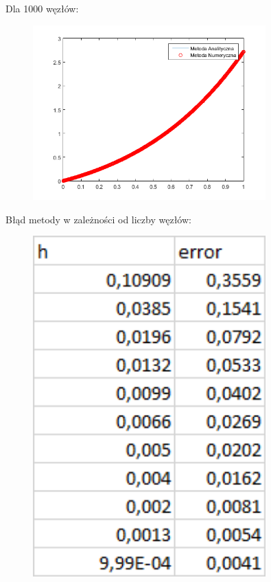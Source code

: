 \begin{samepage}
	Dla 1000 węzłów:
	
	\FloatBarrier
	\begin{figure}[!ht]
		\begin{center}
			\includegraphics[width=0.8\textwidth]{Lab4/charts/zad4/a/1000.png}
		\end{center}
	\end{figure}
	\FloatBarrier
\end{samepage}

\newpage

Błąd metody w zależności od liczby węzłów:

\begin{samepage}
	\FloatBarrier
	\begin{figure}[!ht]
		\begin{center}
			\includegraphics[width=0.8\textwidth]{Lab4/charts/zad4/a/error_dane.png}
		\end{center}
	\end{figure}
	\FloatBarrier
\end{samepage}

